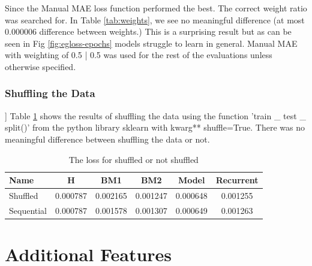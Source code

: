 Since the Manual MAE loss function performed the best. The correct weight ratio was searched for. In Table \ref{tab:weights}, we see no meaningful difference (at most 0.000006 difference between weights.) This is a surprising result but as can be seen in Fig \ref{fig:egloss-epochs} models struggle to learn in general. Manual MAE with weighting of 0.5 | 0.5 was used for the rest of the evaluations unless otherwise specified.

\subsubsection*{Shuffling the Data}]
Table \ref{tab:suffle} shows the results of shuffling the data using the function 'train \_ test \_ split()' from the python library sklearn with kwarg** shuffle=True. There was no meaningful difference between shuffling the data or not.
\begin{table}[h]
	\centering
	\caption{The loss for shuffled or not shuffled}
	\label{tab:suffle}
	\begin{tabular}{p{2cm}ccccc}
		\toprule
		Name &  H &  BM1 &  BM2 &  Model &  Recurrent \\
		\midrule
		Shuffled &       0.000787 &        0.002165 &        0.001247 &   0.000648 &            0.001255 \\
		Sequential &       0.000787 &        0.001578 &        0.001307 &   0.000649 &            0.001263 \\
		\bottomrule
	\end{tabular}
\end{table}

\section{Additional Features}

